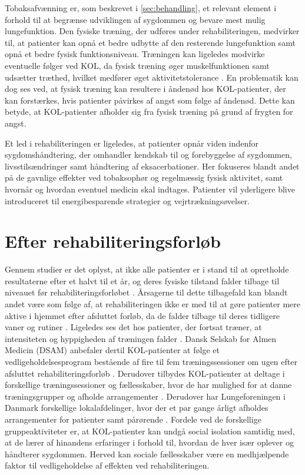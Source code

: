 Tobaksafvænning er, som beskrevet i \autoref{sec:behandling}, et relevant element i forhold til at begrænse udviklingen af sygdommen og bevare mest mulig lungefunktion. Den fysiske træning, der udføres under rehabiliteringen, medvirker til, at patienter kan opnå et bedre udbytte af den resterende lungefunktion samt opnå et bedre fysisk funktionsniveau.\cite{Sundhedsstyrelsen2015}
Træningen kan ligeledes modvirke eventuelle følger ved KOL, da fysisk træning øger muskelfunktionen samt udsætter træthed, hvilket medfører øget aktivitetstolerance \cite{McCarthy2015}. 
En problematik kan dog ses ved, at fysisk træning kan resultere i åndenød hos KOL-patienter, der kan forstærkes, hvis patienter påvirkes af angst som følge af åndenød. Dette kan betyde, at KOL-patienter afholder sig fra fysisk træning på grund af frygten for angst.\cite{McCarthy2015, Sundhedsstyrelsen2015} 

Et led i rehabiliteringen er ligeledes, at patienter opnår viden indenfor sygdomshåndtering, der omhandler kendskab til og forebyggelse af sygdommen, livsstilsændringer samt håndtering af eksacerbationer. Her fokuseres blandt andet på de gavnlige effekter ved tobaksophør og regelmæssig fysisk aktivitet, samt hvornår og hvordan eventuel medicin skal indtages. Patienter vil yderligere blive introduceret til energibesparende strategier og vejrtrækningsøvelser.\cite{McCarthy2015,Sundhedsstyrelsen2015}    

\section{Efter rehabiliteringsforløb} \label{sec:efterRehabilitering}
Gennem studier er det oplyst, at ikke alle patienter er i stand til at opretholde resultaterne efter et halvt til et år, og deres fysiske tilstand falder tilbage til niveauet før rehabiliteringsforløbet \cite{Egan2012,Beachamp2013,Zanaboni2017,Ringbaek2008}. 
Årsagerne til dette tilbagefald kan blandt andet være som følge af, at rehabiliteringen ikke er med til at gøre patienter mere aktive i hjemmet efter afsluttet forløb, da de falder tilbage til deres tidligere vaner og rutiner \cite{Egan2012}. Ligeledes ses det hos patienter, der fortsat træner, at intensiteten og hyppigheden af træningen falder \cite{Ringbaek2008}. 
Dansk Selskab for Almen Medicin (DSAM) anbefaler dertil KOL-patienter
at følge et vedligeholdelsesprogram bestående af fire til fem træningssessioner om ugen
efter afsluttet rehabiliteringsforløb \cite{dsam2016}. Derudover tilbydes KOL-patienter at deltage i forskellige træningssessioner og fællesskaber, hvor de har mulighed for at danne træningsgrupper og afholde arrangementer \cite{Sundhedsstyrelsen2015}. Derudover har Lungeforeningen i Danmark forskellige lokalafdelinger, hvor der et par gange årligt afholdes arrangementer for patienter samt pårørende \cite{Lungeforeningen2016}.
Fordele ved de forskellige gruppeaktiviteter er, at KOL-patienter kan undgå social isolation samtidig med, at de lærer af hinandens erfaringer i forhold til, hvordan de hver især oplever og håndterer sygdommen. Herved kan sociale fællesskaber være en medhjælpende faktor til vedligeholdelse af effekten ved rehabiliteringen.\cite{dsam2016}

